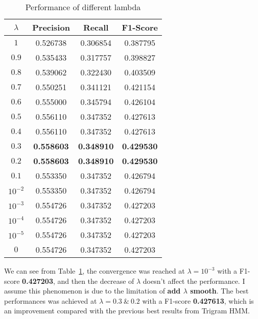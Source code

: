 \begin{table}[!hbt]
\begin{center}
\caption{Performance of different lambda}
\label{tab:lambda}
\begin{tabular}{|c|c|c|c|}
	\hline
	$\lambda$ & \textbf{Precision} & \textbf{Recall} & \textbf{F1-Score} \\
    \hline 
    $1$ & 0.526738 & 0.306854 & 0.387795 \\
    \hline 
    $0.9$ & 0.535433 & 0.317757 & 0.398827 \\
    \hline 
    $0.8$ & 0.539062 & 0.322430 & 0.403509 \\
    \hline
    $0.7$ & 0.550251 & 0.341121 & 0.421154 \\
    \hline 
    $0.6$ & 0.555000 & 0.345794 & 0.426104 \\
    \hline 
    $0.5$ & 0.556110 & 0.347352 & 0.427613 \\
    \hline
    $0.4$ & 0.556110 & 0.347352 & 0.427613 \\
    \hline
    $0.3$ & \textbf{0.558603} & \textbf{0.348910} & \textbf{0.429530} \\
    \hline
    $0.2$ & \textbf{0.558603} & \textbf{0.348910} & \textbf{0.429530} \\
    \hline
	$0.1$ & 0.553350 & 0.347352 & 0.426794 \\
	\hline
	$10^{-2}$ & 0.553350 & 0.347352 & 0.426794 \\
	\hline
	$10^{-3}$ & 0.554726 &  0.347352 & 0.427203 \\
	\hline
	$10^{-4}$ & 0.554726 & 0.347352 & 0.427203 \\
	\hline
	$10^{-5}$& 0.554726 & 0.347352 & 0.427203 \\
	\hline
	$0$ & 0.554726 & 0.347352 & 0.427203 \\
    \hline 
\end{tabular}
\end{center}
\end{table}
    
We can see from Table~\ref{tab:lambda}, the convergence was reached at $\lambda = 10^{-3}$ with a F1-score  \textbf{0.427203}, and then the decrease of $\lambda$ doesn't affect the performance. I assume this phenomenon is due to the limitation of \textbf{add $\lambda$ smooth}. The best performances was achieved at $\lambda = 0.3\ \&\ 0.2$ with a F1-score \textbf{0.427613}, which is an improvement compared with the previous best results from Trigram HMM.

